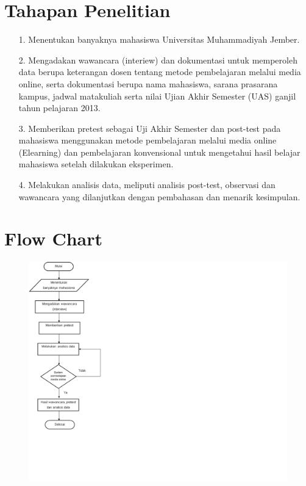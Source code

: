 \documentclass{jtetiproposalskripsi}
\begin{document}
\section{Tahapan Penelitian}
\begin{itemize}
\item[1.]Menentukan banyaknya mahasiswa Universitas Muhammadiyah Jember.
\item[2.]Mengadakan wawancara (interiew) dan dokumentasi untuk memperoleh data berupa keterangan dosen tentang metode pembelajaran melalui media online, serta dokumentasi berupa nama mahasiswa, sarana prasarana kampus, jadwal matakuliah serta nilai Ujian Akhir Semester (UAS) ganjil tahun pelajaran 2013.
\item[3.]Memberikan pretest sebagai Uji Akhir Semester dan post-test pada mahasiswa menggunakan metode pembelajaran melalui media online (Elearning) dan pembelajaran konvensional untuk mengetahui hasil belajar mahasiswa setelah dilakukan eksperimen.
\item[4.]Melakukan analisis data, meliputi analisis post-test, observasi dan wawancara yang dilanjutkan dengan pembahasan dan menarik kesimpulan.
\end{itemize}

\section{Flow Chart}

\begin{center}
\end{center}
\vspace{-0.5cm}
\begin{figure}[ht!]
  \centering
    \includegraphics[width=17cm]{gambar/1}
\end{figure}
\end{document}
